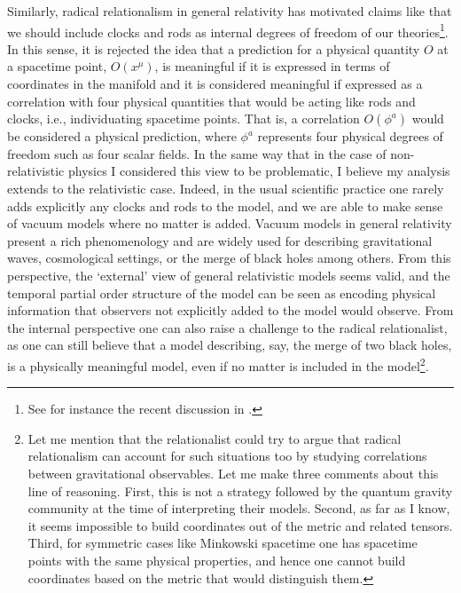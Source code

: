 \documentclass[12 pt]{article}
\begin{document}
Similarly, radical relationalism in general relativity has motivated claims like that we should include clocks and rods as internal degrees of freedom of our theories\footnote{See for instance the recent discussion in \cite{Marchetti2021}.}. In this sense, it is rejected the idea that a prediction for a physical quantity $O$ at a spacetime point, $O(x^{\mu})$, is meaningful if it is expressed in terms of coordinates in the manifold and it is considered meaningful if expressed as a correlation with four physical quantities that would be acting like rods and clocks, i.e., individuating spacetime points. That is, a correlation $O(\phi^a)$ would be considered a physical prediction, where $\phi^a$ represents four physical degrees of freedom such as four scalar fields. In the same way that in the case of non-relativistic physics I considered this view to be problematic, I believe my analysis extends to the relativistic case. Indeed, in the usual scientific practice one rarely adds explicitly any clocks and rods to the model, and we are able to make sense of vacuum models where no matter is added. Vacuum models in general relativity present a rich phenomenology and are widely used for describing gravitational waves, cosmological settings, or the merge of black holes among others. From this perspective, the `external' view of general relativistic models seems valid, and the temporal partial order structure of the model can be seen as encoding physical information that observers not explicitly added to the model would observe. From the internal perspective one can also raise a challenge to the radical relationalist, as one can still believe that a model describing, say, the merge of two black holes, is a physically meaningful model, even if no matter is included in the model\footnote{Let me mention that the relationalist could try to argue that radical relationalism can account for such situations too by studying correlations between gravitational observables. Let me make three comments about this line of reasoning. First, this is not a strategy followed by the quantum gravity community at the time of interpreting their models. Second, as far as I know, it seems impossible to build coordinates out of the metric and related tensors. Third, for symmetric cases like Minkowski spacetime one has spacetime points with the same physical properties, and hence one cannot build coordinates based on the metric that would distinguish them.}.
\end{document}
